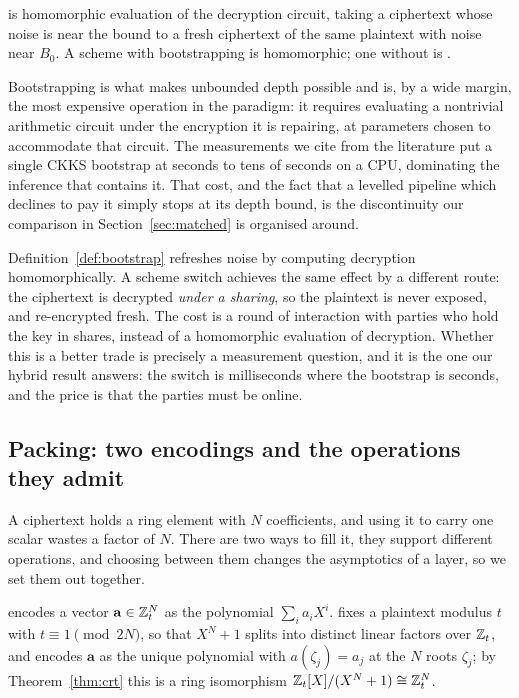 \begin{definition}
\label{def:bootstrap}
 is homomorphic evaluation of the decryption circuit, taking a
ciphertext whose noise is near the bound to a fresh ciphertext of the same
plaintext with noise near $B_0$. A scheme with bootstrapping is 
homomorphic; one without is .
\end{definition}

Bootstrapping is what makes unbounded depth possible and is, by a wide margin, the
most expensive operation in the paradigm: it requires evaluating a nontrivial
arithmetic circuit under the encryption it is repairing, at parameters chosen to
accommodate that circuit. The measurements we cite from the literature put a
single CKKS bootstrap at seconds to tens of seconds on a CPU, dominating the
inference that contains it. That cost, and the fact that a levelled pipeline which
declines to pay it simply stops at its depth bound, is the discontinuity our
comparison in Section~\ref{sec:matched} is organised around.

\begin{remark}
\label{rem:switch-as-bootstrap}
Definition~\ref{def:bootstrap} refreshes noise by computing decryption
homomorphically. A scheme switch achieves the same effect by a different route:
the ciphertext is decrypted \emph{under a sharing}, so the plaintext is never
exposed, and re-encrypted fresh. The cost is a round of interaction with parties
who hold the key in shares, instead of a homomorphic evaluation of decryption.
Whether this is a better trade is precisely a measurement question, and it is the
one our hybrid result answers: the switch is milliseconds where the bootstrap is
seconds, and the price is that the parties must be online.
\end{remark}

\subsection{Packing: two encodings and the operations they admit}
\label{sec:math:packing}

A ciphertext holds a ring element with $N$ coefficients, and using it to carry one
scalar wastes a factor of $N$. There are two ways to fill it, they support
different operations, and choosing between them changes the asymptotics of a
layer, so we set them out together.

\begin{definition}
\label{def:coefpack}
 encodes a vector $\mathbf{a} \in \mathbb{Z}_t^N$ as the
polynomial $\sum_i a_i X^i$.  fixes a plaintext modulus $t$ with
$t \equiv 1 \pmod{2N}$, so that $X^N+1$ splits into distinct linear factors over
$\mathbb{Z}_t$, and encodes $\mathbf{a}$ as the unique polynomial with
$a(\zeta_j) = a_j$ at the $N$ roots $\zeta_j$; by Theorem~\ref{thm:crt} this is a
ring isomorphism $\mathbb{Z}_t[X]/(X^N+1) \cong \mathbb{Z}_t^N$.
\end{definition}


